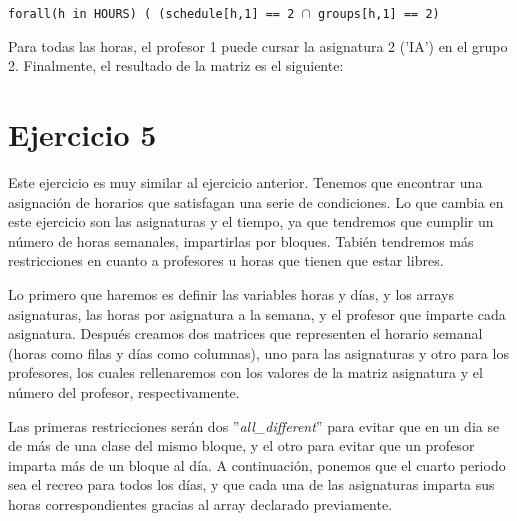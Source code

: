 \documentclass[11pt,a4paper]{article}
\begin{document}
\texttt{forall(h in HOURS) ( (schedule[h,1] == 2 $\cap$ groups[h,1] == 2)}

Para todas las horas, el profesor 1 puede cursar la asignatura 2 ('IA') en el grupo 2. Finalmente, el resultado de la matriz es el siguiente:
\begin{table}[h]
\centering
{}
\end{table}



\section*{Ejercicio 5}
Este ejercicio es muy similar al ejercicio anterior. Tenemos que encontrar una asignación de horarios que satisfagan una serie de condiciones.
Lo que cambia en este ejercicio son las asignaturas y el tiempo, ya que tendremos que cumplir un número de horas semanales, impartirlas
por bloques. Tabién tendremos más restricciones en cuanto a profesores u horas que tienen que estar libres.

Lo primero que haremos es definir las variables horas y días, y los arrays asignaturas, las horas por asignatura a la semana, y el profesor que
imparte cada asignatura. Después creamos dos matrices que representen el horario semanal (horas como filas y días como columnas), uno para las
asignaturas y otro para los profesores, los cuales rellenaremos con los valores de la matriz asignatura y el número del profesor, respectivamente.

Las primeras restricciones serán dos ''\textit{all\_different}'' para evitar que en un dia se de más de una clase del mismo bloque, y el otro
para evitar que un profesor imparta más de un bloque al día. A continuación, ponemos que el cuarto periodo sea el recreo para todos los días, y
que cada una de las asignaturas imparta sus horas correspondientes gracias al array declarado previamente.
\end{document}
